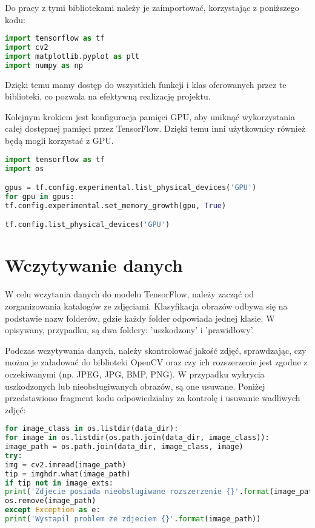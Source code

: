 Do pracy z tymi bibliotekami należy je zaimportować, korzystając z poniższego kodu:

\begin{lstlisting}[language=Python]
import tensorflow as tf
import cv2
import matplotlib.pyplot as plt
import numpy as np
\end{lstlisting}

Dzięki temu mamy dostęp do wszystkich funkcji i klas oferowanych przez te biblioteki, co pozwala na efektywną realizację projektu.

Kolejnym krokiem jest konfiguracja pamięci GPU, aby uniknąć wykorzystania całej dostępnej pamięci przez TensorFlow. Dzięki temu inni użytkownicy również będą mogli korzystać z GPU.

\begin{lstlisting}[language=Python]
import tensorflow as tf
import os

gpus = tf.config.experimental.list_physical_devices('GPU')
for gpu in gpus:
tf.config.experimental.set_memory_growth(gpu, True)

tf.config.list_physical_devices('GPU')
\end{lstlisting}

\section{Wczytywanie danych}
W celu wczytania danych do modelu TensorFlow, należy zacząć od zorganizowania katalogów ze zdjęciami. Klasyfikacja obrazów odbywa się na podstawie nazw folderów, gdzie każdy folder odpowiada jednej klasie. W opisywany, przypadku, są dwa foldery: 'uszkodzony' i 'prawidłowy'.

Podczas wczytywania danych, należy skontrolować jakość zdjęć, sprawdzając, czy można je załadować do biblioteki OpenCV oraz czy ich rozszerzenie jest zgodne z oczekiwanymi (np. JPEG, JPG, BMP, PNG). W przypadku wykrycia uszkodzonych lub nieobsługiwanych obrazów, są one usuwane. Poniżej przedstawiono fragment kodu odpowiedzialny za kontrolę i usuwanie wadliwych zdjęć:

\begin{lstlisting}[language=Python]
for image_class in os.listdir(data_dir):
for image in os.listdir(os.path.join(data_dir, image_class)):
image_path = os.path.join(data_dir, image_class, image)
try:
img = cv2.imread(image_path)
tip = imghdr.what(image_path)
if tip not in image_exts:
print('Zdjecie posiada nieobslugiwane rozszerzenie {}'.format(image_path))
os.remove(image_path)
except Exception as e:
print('Wystapil problem ze zdjeciem {}'.format(image_path))
\end{lstlisting}

